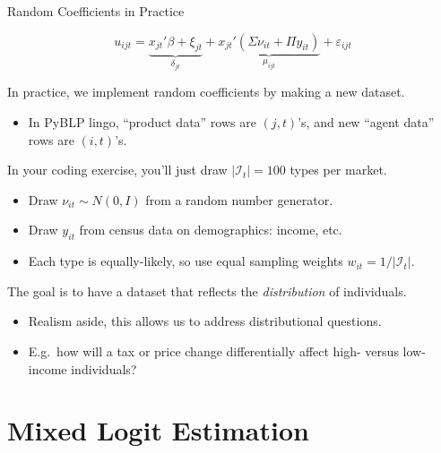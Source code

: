 \documentclass[aspectratio=169,t,11pt,table]{beamer}
\begin{document}
\begin{frame}{Random Coefficients in Practice}
    \vspace{-\baselineskip}
    \begin{minipage}[c][4\baselineskip][c]{\textwidth}
        \begin{equation*}
            u_{ijt} = \underbrace{x_{jt}'\beta + \xi_{jt}}_{\textstyle\delta_{jt}} + \underbrace{x_{jt}'(\Sigma \nu_{it} + \Pi y_{it})}_{\textstyle\mu_{ijt}} + \varepsilon_{ijt}
        \end{equation*}
    \end{minipage}
    \vspace{-0.5\baselineskip}
    \begin{wideitemize}
        \item In practice, we implement random coefficients by making a new dataset.
        \begin{itemize}
            \item In PyBLP lingo, ``product data'' rows are $(j, t)$'s, and new ``agent data'' rows are $(i, t)$'s.
        \end{itemize}
        \pause
        \item In your coding exercise, you'll just draw $|\mathcal{I}_t| = 100$ types per market.
        \begin{itemize}
            \item Draw $\nu_{it} \sim N(0, I)$ from a random number generator.
            \item Draw $y_{it}$ from census data on demographics: income, etc.
            \item Each type is equally-likely, so use equal sampling weights $w_{it} = 1 / |\mathcal{I}_t|$.
        \end{itemize}
        \pause
        \item The goal is to have a dataset that reflects the \textit{distribution} of individuals.
        \begin{itemize}
            \item Realism aside, this allows us to address distributional questions.
            \item E.g.\ how will a tax or price change differentially affect high- versus low-income individuals?
        \end{itemize}
    \end{wideitemize}
\end{frame}

\section{Mixed Logit Estimation}
\end{document}
